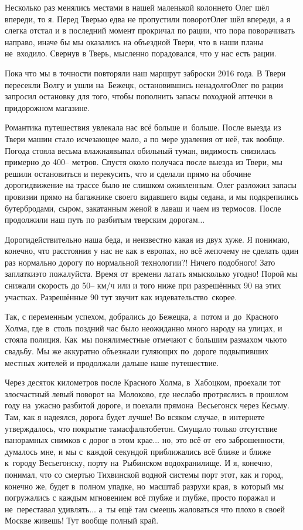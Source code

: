 Несколько раз менялись местами в нашей маленькой колонне\mdash то Олег шёл впереди, то я. Перед Тверью едва не пропустили поворот\mdash Олег шёл впереди, а я слегка отстал и в последний момент прокричал по рации, что пора поворачивать направо, иначе бы мы оказались на объездной Твери, что в наши планы не~входило. Свернув в Тверь, мысленно порадовался, что у нас есть рации.

Пока что мы в точности повторяли наш маршрут заброски 2016 года. В Твери пересекли Волгу и ушли на~Бежецк, остановившись ненадолго\mdash Олег по рации запросил остановку для того, чтобы пополнить запасы походной аптечки в придорожном магазине. 

Романтика путешествия увлекала нас всё больше и~больше. После выезда из Твери машин стало исчезающее мало, а по мере удаления от неё, так вообще. Погода стояла весьма влажная\mdash выпал обильный туман, видимость снизилась примерно до 400\thinspace\nobreakdash-- метров. Спустя около получаса после выезда из Твери, мы решили остановиться и перекусить, что и сделали прямо на обочине дороги\mdash движение на трассе было не слишком оживленным. Олег разложил запасы провизии прямо на багажнике своего видавшего виды седана, и мы подкрепились бутербродами, сыром, закатанным женой в лаваш и чаем из термосов. После продолжили наш путь по разбитым тверским дорогам$\ldots$

Дороги\mdash действительно наша беда, и неизвестно какая из двух хуже. Я понимаю, конечно, что расстояния у нас не как в европах, но всё же\mdash почему не сделать один раз нормально дорогу по нормальной технологии?! Ничего подобного! Зато заплатки\mdash это пожалуйста. Время от~времени латать ямы\mdash сколько угодно! Порой мы снижали скорость до 50\thinspace\nobreakdash-- км/ч или и того ниже при разрешённых 90 на этих участках. Разрешённые 90 тут звучит как издевательство~скорее. 

Так, с переменным успехом, добрались до Бежецка, а~потом и~до~Красного Холма, где в~столь поздний час было неожиданно много народу на улицах, и стояла полиция. Как~мы поняли\mdash местные отмечают с большим размахом чью\sdash то свадьбу. Мы же аккуратно объезжали гуляющих по~дороге подвыпивших местных жителей и продолжали дальше наше путешествие. 

Через десяток километров после Красного Холма, в~Хабоцком, проехали тот злосчастный левый поворот на~Молоково, где неслабо протряслись в прошлом году на~ужасно разбитой дороге, и поехали прямо\mdash на~Весьегонск через Кесьму. Там, как я надеялся, дорога будет лучше! Во всяком случае, в интернете утверждалось, что покрытие там\mdash асфальтобетон. Смущало только отсутствие панорамных снимков с дорог в этом крае$\ldots$ но, это всё от~его заброшенности, думалось мне, и мы с~каждой секундой приближались всё ближе и ближе к~городу Весьегонску, порту на~Рыбинском водохранилище. И я, конечно, понимал, что со смертью Тихвинской водной системы порт этот, как и город, конечно же, будет в~полном упадке, но~масштаб разрухи края, в~который мы погружались с каждым мгновением всё глубже и глубже, просто поражал и не~переставал удивлять$\ldots$ а~ты ещё там смеешь жаловаться что плохо в своей Москве живешь! Тут вообще полный край. 

